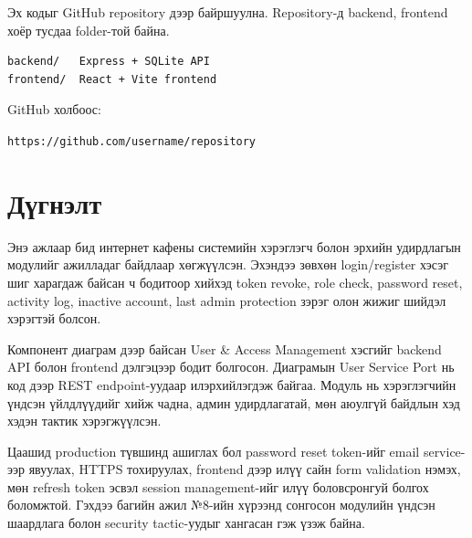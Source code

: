 \documentclass[12pt,a4paper]{article}
\begin{document}
Эх кодыг GitHub repository дээр байршуулна. Repository-д backend, frontend хоёр тусдаа folder-той байна.

\begin{lstlisting}[style=api]
backend/   Express + SQLite API
frontend/  React + Vite frontend
\end{lstlisting}

GitHub холбоос:

\begin{center}
\texttt{https://github.com/username/repository}
\end{center}

\section{Дүгнэлт}

Энэ ажлаар бид интернет кафены системийн хэрэглэгч болон эрхийн удирдлагын модулийг ажилладаг байдлаар хөгжүүлсэн. Эхэндээ зөвхөн login/register хэсэг шиг харагдаж байсан ч бодитоор хийхэд token revoke, role check, password reset, activity log, inactive account, last admin protection зэрэг олон жижиг шийдэл хэрэгтэй болсон.

Компонент диаграм дээр байсан User \& Access Management хэсгийг backend API болон frontend дэлгэцээр бодит болгосон. Диаграмын User Service Port нь код дээр REST endpoint-уудаар илэрхийлэгдэж байгаа. Модуль нь хэрэглэгчийн үндсэн үйлдлүүдийг хийж чадна, админ удирдлагатай, мөн аюулгүй байдлын хэд хэдэн тактик хэрэгжүүлсэн.

Цаашид production түвшинд ашиглах бол password reset token-ийг email service-ээр явуулах, HTTPS тохируулах, frontend дээр илүү сайн form validation нэмэх, мөн refresh token эсвэл session management-ийг илүү боловсронгуй болгох боломжтой. Гэхдээ багийн ажил №8-ийн хүрээнд сонгосон модулийн үндсэн шаардлага болон security tactic-уудыг хангасан гэж үзэж байна.
\end{document}
